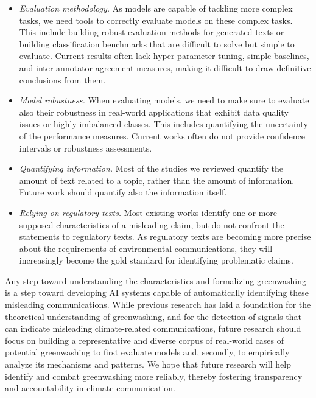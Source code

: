 \begin{itemize}
    \item \textit{Evaluation methodology.} As models are capable of tackling more complex tasks, we need tools to correctly evaluate models on these complex tasks. This include building robust evaluation methods for generated texts or building classification benchmarks that are difficult to solve but simple to evaluate. Current results often lack hyper-parameter tuning,  simple baselines, and inter-annotator agreement measures, making it difficult to draw definitive conclusions from them.
    \item  \textit{Model robustness.} When evaluating models, we need to make sure to evaluate also their robustness in real-world applications that exhibit data quality issues or highly imbalanced classes. This includes quantifying the uncertainty of the performance measures. Current works often do not provide confidence intervals or robustness assessments.
    \item \textit{Quantifying information.} Most of the studies we reviewed quantify the amount of text related to a topic, rather than the amount of information. Future work should quantify also the information itself. 
    \item \textit{Relying on regulatory texts.} Most existing works identify one or more supposed characteristics of a misleading claim, but do not confront the statements to regulatory texts. As regulatory texts are becoming more precise about the requirements of environmental communications, they will increasingly become the gold standard %
    for identifying problematic claims.
\end{itemize}


Any step toward understanding the characteristics and formalizing greenwashing is a step toward developing AI systems capable of automatically identifying these misleading communications. 
While previous research has laid a foundation for the theoretical understanding of greenwashing, and for the detection of signals that can indicate misleading climate-related communications, future research should focus on building a representative and diverse corpus of real-world cases of potential greenwashing  to first evaluate models and, secondly, to empirically analyze its mechanisms and patterns. We hope that future research will help identify and combat greenwashing more reliably, thereby fostering transparency and accountability in climate communication.

